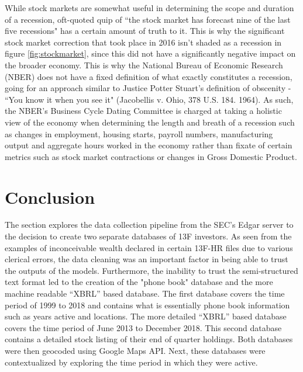 While stock markets are somewhat useful in determining the scope and duration of a recession, \cite{Samuelson1966} oft-quoted quip of ``the
stock market has forecast nine of the last five recessions" has a certain amount of truth to it. This is why the significant stock market correction that took place in 2016 isn't shaded as a recession in figure \ref{fig:stockmarket}, since this did not have a significantly negative impact on the broader economy. This is why the National Bureau of Economic Research (NBER) does not have a fixed definition of what exactly constitutes a recession, going for an approach similar to Justice Potter Stuart's definition of obscenity - ``You know it when you see it" (Jacobellis v. Ohio, 378 U.S. 184. 1964). As such, the NBER's Business Cycle Dating Committee is charged at taking a holistic view of the economy when determining the length and breath of a recession such as changes in employment, housing starts, payroll numbers, manufacturing output and aggregate hours worked in the economy rather than fixate of certain metrics such as stock market contractions or changes in Gross Domestic Product\citep{NBERBCDC2020}.  




\section{Conclusion}


The section explores the data collection pipeline from the SEC's Edgar server to the decision to create two separate databases of 13F investors. As seen from the examples of inconceivable wealth declared in certain 13F-HR files due to various clerical errors, the data cleaning was an important factor in being able to trust the outputs of the models.  Furthermore, the inability to trust the semi-structured text format led to the creation of the "phone book" database and the more machine readable ``XBRL'' based database.  The first database covers the time period of 1999 to 2018 and contains what is essentially phone book information such as years active and locations. The more detailed ``XBRL'' based database covers the time period of June 2013 to December 2018.  This second database contains a detailed stock listing of their end of quarter holdings.  Both databases were then geocoded using Google Maps API.  Next, these databases were contextualized by exploring the time period in which they were active.  

